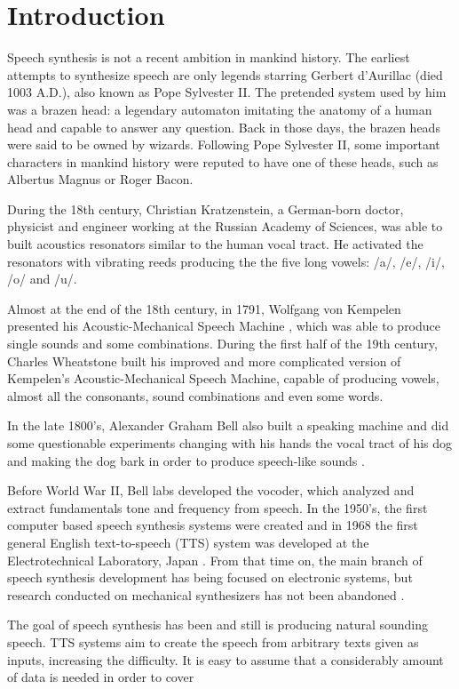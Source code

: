 \section{Introduction}
\label{intro}
\thispagestyle{empty}

Speech synthesis is not a recent ambition in mankind history. The earliest attempts to synthesize speech are only legends starring Gerbert d'Aurillac (died 1003 A.D.), also known as Pope Sylvester II. The pretended system used by him was a brazen head: a legendary automaton imitating the anatomy of a human head and capable to answer any question. Back in those days, the brazen heads were said to be owned by wizards. Following Pope Sylvester II, some important characters in mankind history  were reputed to have one of these heads, such as Albertus Magnus or Roger Bacon.

During the 18th century, Christian Kratzenstein, a German-born doctor, physicist and engineer working at the Russian Academy of Sciences, was able to built acoustics resonators similar to the human vocal tract. He activated the resonators with vibrating reeds producing the the five long vowels: /a/, /e/, /i/, /o/ and /u/.

Almost at the end of the 18th century, in 1791, Wolfgang von Kempelen presented his Acoustic-Mechanical Speech Machine \cite{vonKempelen}, which was able to produce single sounds and some combinations. During the first half of the 19th century, Charles Wheatstone built his improved and more complicated version of Kempelen's Acoustic-Mechanical Speech Machine, capable of producing vowels, almost all the consonants, sound combinations and even some words.	

In the late 1800's, Alexander Graham Bell also built a speaking machine and did some questionable experiments changing with his hands the vocal tract of his dog and making the dog bark in order to produce speech-like sounds \cite{Schroeder93, LemmettyMSc}.

Before World War II, Bell labs developed the vocoder, which analyzed and extract fundamentals tone and frequency from speech. In the 1950's, the first computer based speech synthesis systems were created and in 1968 the first general English text-to-speech (TTS) system was developed at the Electrotechnical Laboratory, Japan \cite{Klatt87}. From that time on, the main branch of speech synthesis development has being focused on electronic systems, but research conducted on mechanical synthesizers has not been abandoned \cite{mechSynthWeb, mechSynth}.

The goal of speech synthesis has been and still is producing natural sounding speech. TTS systems aim to create the speech from arbitrary texts given as inputs, increasing the difficulty. It is easy to assume that a considerably amount of data is needed in order to cover 